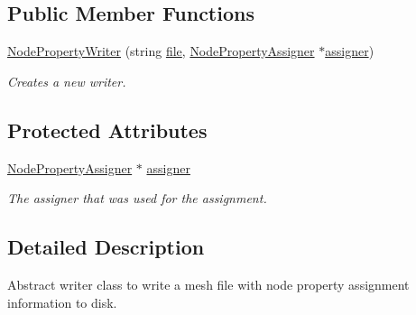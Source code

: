 \subsection*{Public Member Functions}
\begin{DoxyCompactItemize}
\item 
\hyperlink{classmesh_1_1_node_property_writer_a973c19fe472c306c9d970a012d4e2137}{NodePropertyWriter} (string \hyperlink{classmesh_1_1_property_writer_a296638bd6daba8a6545688bacfc4fef1}{file}, \hyperlink{classassignment_1_1_node_property_assigner}{NodePropertyAssigner} $\ast$\hyperlink{classmesh_1_1_node_property_writer_a3cfacf6c61f8f0131cc832f110526402}{assigner})
\begin{DoxyCompactList}\small\item\em Creates a new writer. \item\end{DoxyCompactList}\end{DoxyCompactItemize}
\subsection*{Protected Attributes}
\begin{DoxyCompactItemize}
\item 
\hypertarget{classmesh_1_1_node_property_writer_a3cfacf6c61f8f0131cc832f110526402}{
\hyperlink{classassignment_1_1_node_property_assigner}{NodePropertyAssigner} $\ast$ \hyperlink{classmesh_1_1_node_property_writer_a3cfacf6c61f8f0131cc832f110526402}{assigner}}
\label{classmesh_1_1_node_property_writer_a3cfacf6c61f8f0131cc832f110526402}

\begin{DoxyCompactList}\small\item\em The assigner that was used for the assignment. \item\end{DoxyCompactList}\end{DoxyCompactItemize}


\subsection{Detailed Description}
Abstract writer class to write a mesh file with node property assignment information to disk. 

